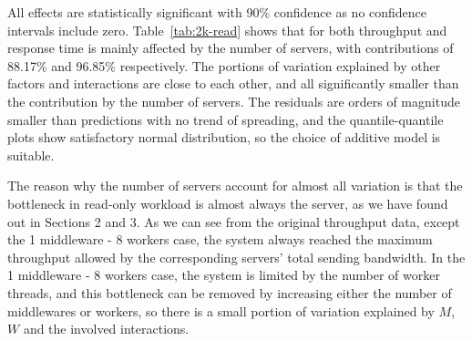 All effects are statistically significant with 90\% confidence as no confidence intervals include zero. Table~\ref{tab:2k-read} shows that for both throughput and response time is mainly affected by the number of servers, with contributions of 88.17\% and 96.85\% respectively. The portions of variation explained by other factors and interactions are close to each other, and all significantly smaller than the contribution by the number of servers. The residuals are orders of magnitude smaller than predictions with no trend of spreading, and the quantile-quantile plots show satisfactory normal distribution, so the choice of additive model is suitable.

The reason why the number of servers account for almost all variation is that the bottleneck in read-only workload is almost always the server, as we have found out in Sections 2 and 3. As we can see from the original throughput data, except the 1 middleware - 8 workers case, the system always reached the maximum throughput allowed by the corresponding servers' total sending bandwidth. In the 1 middleware - 8 workers case, the system is limited by the number of worker threads, and this bottleneck can be removed by increasing either the number of middlewares or workers, so there is a small portion of variation explained by $M$, $W$ and the involved interactions.
